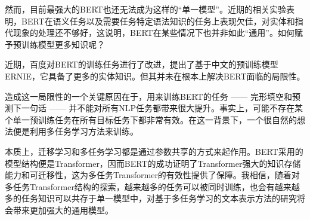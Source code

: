 然而，目前最强大的BERT也还无法成为这样的“单一模型”。近期的相关实验表明，BERT在语义任务以及需要任务特定语法知识的任务上表现欠佳，对实体和指代现象的处理还不够好\cite{tenney2018you}\cite{liu2019linguistic}，这说明，BERT在某些情况下也并非如此“通用”。如何赋予预训练模型更多知识呢？

近期，百度对BERT的训练任务进行了改进，提出了基于中文的预训练模型ERNIE，它具备了更多的实体知识。但其并未在根本上解决BERT面临的局限性。

造成这一局限性的一个关键原因在于，用来训练BERT的任务 —— 完形填空和预测下一句话 —— 并不能对所有NLP任务都带来很大提升。事实上，可能不存在某个单一预训练任务在所有目标任务下都非常有效。在这一背景下，一个很自然的想法便是利用多任务学习方法来训练。

本质上，迁移学习和多任务学习都是通过参数共享的方式来起作用。BERT采用的模型结构便是Transformer，因而BERT的成功证明了Transformer强大的知识存储能力和可迁移性，这为多任务Transformer的有效性提供了保障。我相信，随着对多任务Transformer结构的探索，越来越多的任务可以被同时训练，也会有越来越多的任务知识可以共存于单一模型中，对基于多任务学习的文本表示方法的研究将会带来更加强大的通用模型。

